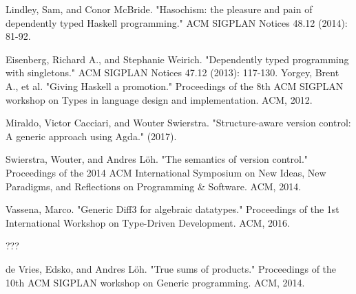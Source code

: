 \documentclass[11pt]{article}
\begin{document}
\begin{thebibliography}{9}
  

  Lindley, Sam, and Conor McBride. "Hasochism: the pleasure and pain of dependently typed Haskell programming." ACM SIGPLAN Notices 48.12 (2014): 81-92.

  Eisenberg, Richard A., and Stephanie Weirich. "Dependently typed programming with singletons." ACM SIGPLAN Notices 47.12 (2013): 117-130.
  Yorgey, Brent A., et al. "Giving Haskell a promotion." Proceedings of the 8th ACM SIGPLAN workshop on Types in language design and implementation. ACM, 2012.
  
   Miraldo, Victor Cacciari, and Wouter Swierstra. "Structure-aware version control: A generic approach using Agda." (2017).

  Swierstra, Wouter, and Andres Löh. "The semantics of version control." Proceedings of the 2014 ACM International Symposium on New Ideas, New Paradigms, and Reflections on Programming & Software. ACM, 2014.
  
  Vassena, Marco. "Generic Diff3 for algebraic datatypes." Proceedings of the 1st International Workshop on Type-Driven Development. ACM, 2016.

  ???
  
  de Vries, Edsko, and Andres Löh. "True sums of products." Proceedings of the 10th ACM SIGPLAN workshop on Generic programming. ACM, 2014.
 \end{thebibliography}
\end{document}
